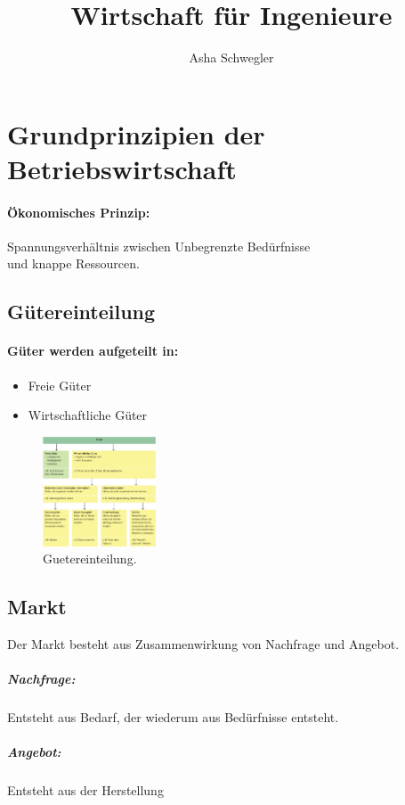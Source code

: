 \documentclass{article}
\title{Wirtschaft für Ingenieure}
\author{Asha Schwegler}
\begin{document}
\maketitle

\section{Grundprinzipien der Betriebswirtschaft}

\paragraph{Ökonomisches Prinzip:}
Spannungsverhältnis zwischen Unbegrenzte Bedürfnisse\\
und knappe Ressourcen.

\subsection{Gütereinteilung}
\paragraph{Güter werden aufgeteilt in:}

\begin{itemize}
\item Freie Güter
\item Wirtschaftliche Güter
\end{itemize}

\begin{figure}[H]
\centering
\includegraphics[width=0.3\textwidth]{Resources/Image/Guetereinteilung.png}
\caption{\label{fig:Guetereinteilung}Guetereinteilung.}
\end{figure}


\subsection{Markt}
Der Markt besteht aus Zusammenwirkung von Nachfrage und Angebot. \\
\subparagraph{Nachfrage:} Entsteht aus Bedarf, der wiederum aus Bedürfnisse entsteht.
\subparagraph{Angebot:} 
Entsteht aus der Herstellung
\end{document}
